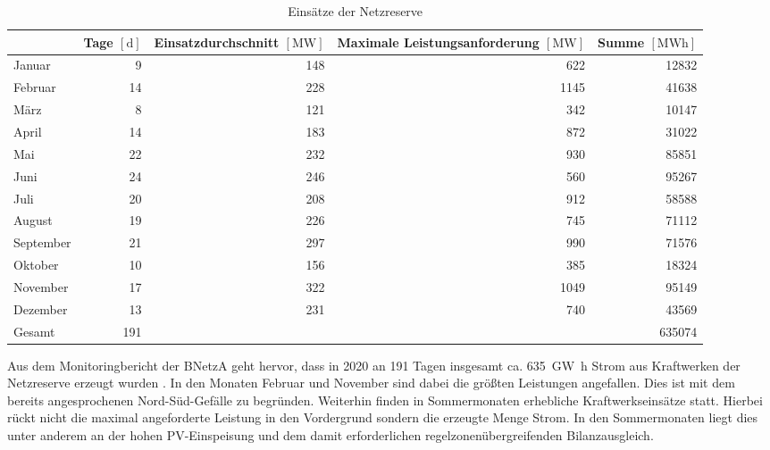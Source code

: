 			\begin{table}[H]
				\centering
				\caption{Einsätze der Netzreserve \cite{Monitoringbericht_BNetzA}}
				\label{Tab. Einsätze Netzreserve}
				\begin{tabular}{lrrrr}
					\hline
					& \makecell[c]{Tage \\ $\left[\si{\day}\right]$} & \makecell[c]{Einsatzdurchschnitt \\ $\left[\si{\mega\watt}\right]$} & \makecell[c]{Maximale Leistungsanforderung \\ $\left[\si{\mega\watt}\right]$} & \makecell[c]{Summe \\ $\left[\si{\mega\watt\hour}\right]$} \\ \hline
					Januar & \num{9} & \num{148} & \num{622} & \num{12832} \\
					Februar & \num{14} & \num{228} & \num{1145} & \num{41638} \\
					März & \num{8} & \num{121} & \num{342} & \num{10147} \\
					April & \num{14} & \num{183} & \num{872} & \num{31022} \\
					Mai & \num{22} & \num{232} & \num{930} & \num{85851} \\
					Juni & \num{24} & \num{246} & \num{560} & \num{95267} \\
					Juli & \num{20} & \num{208} & \num{912} & \num{58588} \\
					August & \num{19} & \num{226} & \num{745} & \num{71112} \\
					September & \num{21} & \num{297} & \num{990} & \num{71576} \\
					Oktober & \num{10} & \num{156} & \num{385} & \num{18324} \\
					November & \num{17} & \num{322} & \num{1049} & \num{95149} \\
					Dezember & \num{13} & \num{231} & \num{740} & \num{43569} \\ \hline
					Gesamt & \num{191} &  &  & \num{635074} \\ \hline
				\end{tabular}
			\end{table}
			
			Aus dem Monitoringbericht der BNetzA geht hervor, dass in 2020 an \num{191} Tagen insgesamt ca. \SI{635}{\giga\watt\hour} Strom aus Kraftwerken der Netzreserve erzeugt wurden \cite{Monitoringbericht_BNetzA}.
			In den Monaten Februar und November sind dabei die größten Leistungen angefallen.
			Dies ist mit dem bereits angesprochenen Nord-Süd-Gefälle zu begründen.	
			Weiterhin finden in Sommermonaten erhebliche Kraftwerkseinsätze statt.
			Hierbei rückt nicht die maximal angeforderte Leistung in den Vordergrund sondern die erzeugte Menge Strom.
			In den Sommermonaten liegt dies unter anderem an der hohen PV-Einspeisung und dem damit erforderlichen regelzonenübergreifenden  Bilanzausgleich.
		    
